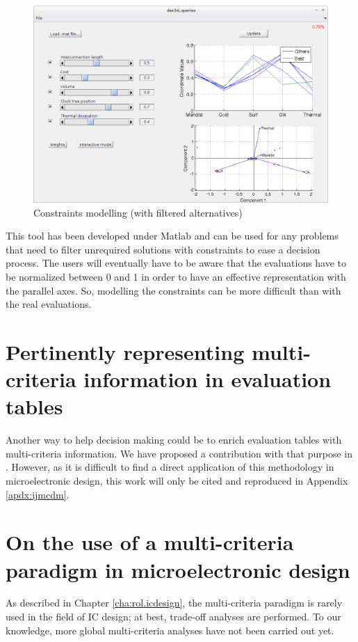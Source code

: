 \begin{figure}[h!]
\begin{center}
\includegraphics[width=\linewidth]{dseconstraints2}
\end{center}
\caption{Constraints modelling (with filtered alternatives)}
\label{fig:dse2}
\end{figure}

This tool has been developed under Matlab and can be used for any problems that need to filter unrequired solutions with constraints to ease a decision process. The users will eventually have to be aware that the evaluations have to be normalized between 0 and 1 in order to have an effective representation with the parallel axes. So, modelling the constraints can be more difficult than with the real evaluations.

\section{Pertinently representing multi-criteria information in evaluation tables}
Another way to help decision making could be to enrich evaluation tables with multi-criteria information. We have proposed a contribution with that purpose in \cite{LidDoaDes2014:techreport}. However, as it is difficult to find a direct application of this methodology in microelectronic design, this work will only be cited and reproduced in Appendix \ref{apdx:ijmcdm}.

\section{On the use of a multi-criteria paradigm in microelectronic design}
As described in Chapter \ref{cha:rol.icdesign}, the multi-criteria paradigm is rarely used in the field of IC design; at best, trade-off analyses are performed. To our knowledge, more global multi-criteria analyses have not been carried out yet.

